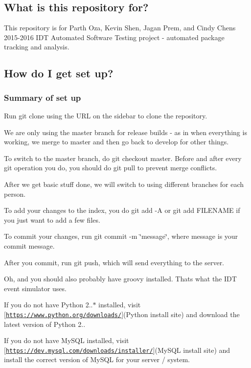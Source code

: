 \subsection*{What is this repository for?}

This repository is for Parth Oza, Kevin Shen, Jagan Prem, and Cindy Chen\textquotesingle{}s 2015-\/2016 I\+DT Automated Software Testing project -\/ automated package tracking and analysis.

\subsection*{How do I get set up?}

\subsubsection*{Summary of set up}

Run {\ttfamily git clone} using the U\+RL on the sidebar to clone the repository.

We are only using the {\ttfamily master} branch for release builds -\/ as in when everything is working, we merge to master and then go back to develop for other things.

To switch to the {\ttfamily master} branch, do {\ttfamily git checkout master}. Before and after every {\ttfamily git} operation you do, you should do {\ttfamily git pull} to prevent merge conflicts.

After we get basic stuff done, we will switch to using different branches for each person.

To add your changes to the {\ttfamily index}, you do {\ttfamily git add -\/A} or {\ttfamily git add F\+I\+L\+E\+N\+A\+ME} if you just want to add a few files.

To commit your changes, run {\ttfamily git commit -\/m \char`\"{}message\char`\"{}}, where message is your commit message.

After you commit, run {\ttfamily git push}, which will send everything to the server.

Oh, and you should also probably have {\ttfamily groovy} installed. That\textquotesingle{}s what the I\+DT event simulator uses.

If you do not have Python 2..$\ast$ installed, visit \mbox{[}\href{https://www.python.org/downloads/}{\tt https\+://www.\+python.\+org/downloads/}\mbox{]}(Python install site) and download the latest version of Python 2..

If you do not have My\+S\+QL installed, visit \mbox{[}\href{https://dev.mysql.com/downloads/installer/}{\tt https\+://dev.\+mysql.\+com/downloads/installer/}\mbox{]}(My\+S\+QL install site) and install the correct version of My\+S\+QL for your server / system.

